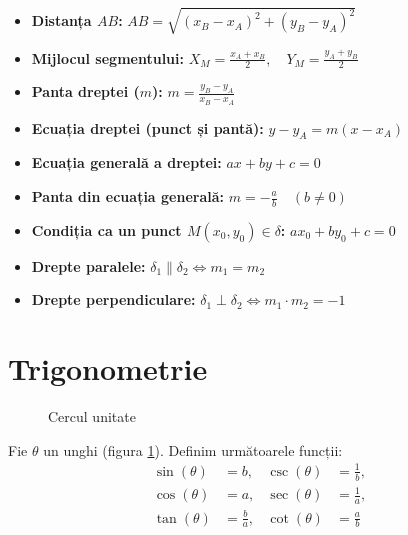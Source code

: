 \documentclass[11pt,a4paper]{article}
\newcommand\mytheta{110} %
\begin{document}
\begin{itemize}
    \item \textbf{Distanța $AB$:} $ AB = \sqrt{(x_B - x_A)^2 + (y_B - y_A)^2} $
    \item \textbf{Mijlocul segmentului:} $ X_M = \frac{x_A + x_B}{2}, \quad Y_M = \frac{y_A + y_B}{2} $
    \item \textbf{Panta dreptei ($m$):} $ m = \frac{y_B - y_A}{x_B - x_A} $
    \item \textbf{Ecuația dreptei (punct și pantă):} $ y - y_A = m(x - x_A) $
    \item \textbf{Ecuația generală a dreptei:} $ ax + by + c = 0 $
    \item \textbf{Panta din ecuația generală:} $ m = -\frac{a}{b} \quad (b \neq 0) $
    \item \textbf{Condiția ca un punct $M(x_0, y_0) \in \delta$:} $ ax_0 + by_0 + c = 0 $
    \item \textbf{Drepte paralele:} $ \delta_1 \parallel \delta_2 \iff m_1 = m_2 $
    \item \textbf{Drepte perpendiculare:} $ \delta_1 \perp \delta_2 \iff m_1 \cdot m_2 = -1 $
\end{itemize}

\section{Trigonometrie}
\begin{figure}
\caption{Cercul unitate}
\label{trig}
\end{figure}
Fie $\theta$ un unghi (figura \ref{trig}).
Definim următoarele funcții:
\begin{align*}
\sin(\theta) &= b, & \csc(\theta) &= \frac{1}{b},\\
\cos(\theta) &= a, & \sec(\theta) &= \frac{1}{a},\\
\tan(\theta) &= \frac{b}{a}, & \cot(\theta) &= \frac{a}{b}
\end{align*}
\end{document}
